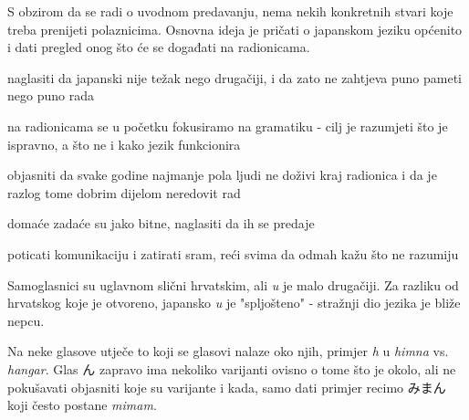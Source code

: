 
\author{autor}

	
	S obzirom da se radi o uvodnom predavanju, nema nekih konkretnih stvari koje treba prenijeti polaznicima. Osnovna ideja je pričati o japanskom jeziku općenito i dati pregled onog što će se događati na radionicama.
	
	\begin{hyou}
		\item naglasiti da japanski nije težak nego drugačiji, i da zato ne zahtjeva puno pameti nego puno rada
		\item na radionicama se u početku fokusiramo na gramatiku - cilj je razumjeti što je ispravno, a što ne i kako jezik funkcionira
		\item objasniti da svake godine najmanje pola ljudi ne doživi kraj radionica i da je razlog tome dobrim dijelom neredovit rad
		\item domaće zadaće su jako bitne, naglasiti da ih se predaje
		\item poticati komunikaciju i zatirati sram, reći svima da odmah kažu što ne razumiju
	\end{hyou}

	
	Samoglasnici su uglavnom slični hrvatskim, ali \textit{u} je malo drugačiji. Za razliku od hrvatskog koje je otvoreno, japansko \textit{u} je "spljošteno" - stražnji dio jezika je bliže nepcu.
	
	Na neke glasove utječe to koji se glasovi nalaze oko njih, primjer \textit{h} u \textit{himna} vs. \textit{hangar}. Glas ん zapravo ima nekoliko varijanti ovisno o tome što je okolo, ali ne pokušavati objasniti koje su varijante i kada, samo dati primjer recimo みまん koji često postane \textit{mimam}.
